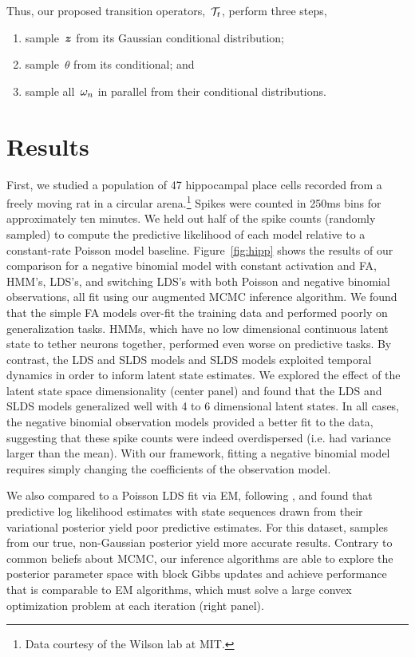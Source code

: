 Thus, our proposed transition operators,~$\mathcal{T}_t$, perform three steps, 
\begin{enumerate}
\item sample~$\boldsymbol{z}$ from its Gaussian conditional distribution;
\item sample~$\theta$ from its conditional; and
\item sample all~${\omega}_n$ in parallel from their \polyagamma conditional distributions.
\end{enumerate}



\section{Results}
First, we studied a population of 47 hippocampal place cells recorded from a freely moving rat in a 
circular arena.\footnote{Data courtesy of the Wilson lab at MIT.} Spikes were counted in 
250ms bins for approximately ten minutes.
 We held out half of the spike counts (randomly sampled) to compute the predictive 
likelihood of each model relative to a constant-rate Poisson model baseline. 
Figure~\ref{fig:hipp} shows the results of our comparison for a negative binomial model with constant 
activation and FA, HMM's, LDS's, and switching LDS's with both Poisson and negative binomial observations,
all fit using our augmented MCMC inference algorithm.  We found that the simple FA models over-fit the 
training data and performed poorly on generalization tasks. HMMs, which 
have no low dimensional continuous latent state to tether neurons together, 
performed even worse on predictive tasks. By contrast, the LDS and SLDS 
models and SLDS models exploited temporal dynamics in order to inform latent state estimates.
We explored the effect of the latent state space dimensionality (center panel) and found that 
the LDS and SLDS models generalized well with 4 to 6 dimensional latent states. 
In all cases, the negative binomial 
observation models provided a better fit to the data, suggesting that these 
spike counts were indeed overdispersed (i.e. had variance larger than the mean). With 
our framework, fitting a negative binomial model requires simply changing the 
coefficients of the observation model.

We also compared to a Poisson LDS fit via EM, following \citep{macke2011empirical},
and found that predictive log likelihood estimates with state sequences drawn from 
their variational posterior yield poor predictive estimates. For this dataset, samples 
from our true, non-Gaussian posterior yield more accurate results. Contrary 
to common beliefs about MCMC, our inference algorithms are able to 
explore the posterior parameter space with block Gibbs updates and achieve performance 
that is comparable to EM algorithms, which must solve a large convex optimization problem 
at each iteration (right panel).

